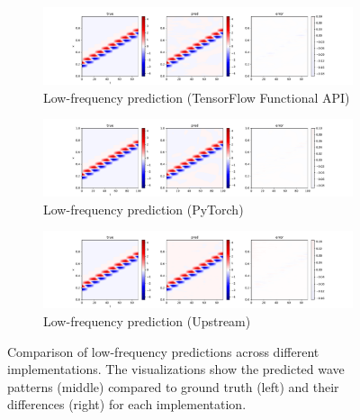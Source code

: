 \documentclass[10pt,journal,compsoc,onecolumn]{IEEEtran}
\begin{document}
\begin{figure}[htbp]
    \centering
    \begin{subfigure}[b]{0.9\textwidth}
        \includegraphics[width=\textwidth]{../../results/functional/low-frequency-adam-20250206-1105-1/vis}
        \caption{Low-frequency prediction (TensorFlow Functional API)}
        \label{fig:low_freq_functional}
    \end{subfigure}
    \begin{subfigure}[b]{0.9\textwidth}
        \includegraphics[width=\textwidth]{../../results/pytorch/low-frequency-adam-20250206-1600-4/vis}
        \caption{Low-frequency prediction (PyTorch)}
        \label{fig:low_freq_pytorch}
    \end{subfigure}
    \begin{subfigure}[b]{0.9\textwidth}
        \includegraphics[width=\textwidth]{../../results/upstream/low-frequency-adabelief-20250206-1105-3/vis}
        \caption{Low-frequency prediction (Upstream)}
        \label{fig:low_freq_upstream}
    \end{subfigure}
    \caption{Comparison of low-frequency predictions across different implementations. The visualizations show the predicted wave patterns (middle) compared to ground truth (left) and their differences (right) for each implementation.}
    \label{fig:low_freq_comparison}
\end{figure}
\end{document}
